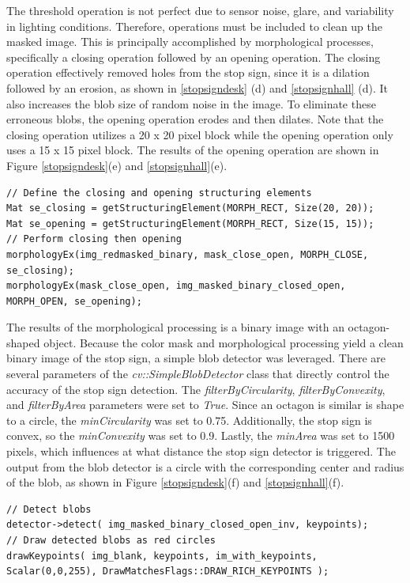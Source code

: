 \documentclass[letterpaper, 10 pt, conference]{ieeeconf}  %
\begin{document}
The threshold operation is not perfect due to sensor noise, glare, and variability in lighting conditions. Therefore, operations must be included to clean up the masked image. This is principally accomplished by morphological processes, specifically a closing operation followed by an opening operation. The closing operation effectively removed holes from the stop sign, since it is a dilation followed by an erosion, as shown in \ref{stopsigndesk} (d) and \ref{stopsignhall} (d). It also increases the blob size of random noise in the image. To eliminate these erroneous blobs, the opening operation erodes and then dilates. Note that the closing operation utilizes a 20 x 20 pixel block while the opening operation only uses a 15 x 15 pixel block. The results of the opening operation are shown in Figure \ref{stopsigndesk}(e) and \ref{stopsignhall}(e).

\begin{lstlisting}
// Define the closing and opening structuring elements
Mat se_closing = getStructuringElement(MORPH_RECT, Size(20, 20));
Mat se_opening = getStructuringElement(MORPH_RECT, Size(15, 15));
// Perform closing then opening
morphologyEx(img_redmasked_binary, mask_close_open, MORPH_CLOSE, se_closing);
morphologyEx(mask_close_open, img_masked_binary_closed_open, MORPH_OPEN, se_opening);
\end{lstlisting}

The results of the morphological processing is a binary image with an octagon-shaped object. Because the color mask and morphological processing yield a clean binary image of the stop sign, a simple blob detector was leveraged. There are several parameters of the \textit{cv::SimpleBlobDetector} class that directly control the accuracy of the stop sign detection. The \textit{filterByCircularity}, \textit{filterByConvexity}, and \textit{filterByArea}  parameters were set to \textit{True}. Since an octagon is similar is shape to a circle, the \textit{minCircularity} was set to 0.75. Additionally, the stop sign is convex, so the \textit{minConvexity} was set to 0.9. Lastly, the \textit{minArea} was set to 1500 pixels, which influences at what distance the stop sign detector is triggered. The output from the blob detector is a circle with the corresponding center and radius of the blob, as shown in Figure \ref{stopsigndesk}(f) and \ref{stopsignhall}(f).

\begin{lstlisting}
// Detect blobs
detector->detect( img_masked_binary_closed_open_inv, keypoints);
// Draw detected blobs as red circles
drawKeypoints( img_blank, keypoints, im_with_keypoints, Scalar(0,0,255), DrawMatchesFlags::DRAW_RICH_KEYPOINTS );
\end{lstlisting}
\end{document}
